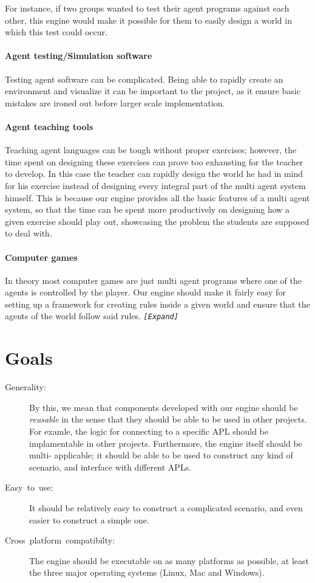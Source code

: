 For instance, if two groups wanted to test their agent programs against
each other, this engine would make it possible for them to easily
design a world in which this test could occur.


\paragraph*{Agent testing/Simulation software}

Testing agent software can be complicated. Being able to rapidly create
an environment and visualize it can be important to the project, as
it ensure basic mistakes are ironed out before larger scale implementation. 


\paragraph*{Agent teaching tools}

Teaching agent languages can be tough without proper exercises; however,
the time spent on designing these exercises can prove too exhausting
for the teacher to develop. In this case the teacher can rapidly design
the world he had in mind for his exercise instead of designing every
integral part of the multi agent system himself. This is because our
engine provides all the basic features of a multi agent system, so
that the time can be spent more productively on designing how a given
exercise should play out, showcasing the problem the students are
supposed to deal with.


\paragraph*{Computer games}

In theory most computer games are just multi agent programs where
one of the agents is controlled by the player. Our engine should make
it fairly easy for setting up a framework for creating rules inside
a given world and ensure that the agents of the world follow said
rules. \texttt{\emph{{[}Expand{]}}}


\section*{Goals}
\begin{description}
\item [{Generality:}] By this, we mean that components developed with our
engine should be \emph{reusable} in the sense that they should be
able to be used in other projects. For examle, the logic for connecting
to a specific APL should be implamentable in other projects. Furthermore,
the engine itself should be multi- applicable; it should be able to
be used to construct any kind of scenario, and interface with different
APLs.
\item [{Easy~to~use:}] It should be relatively easy to construct a complicated
scenario, and even easier to construct a simple one.
\item [{Cross~platform~compatibilty:}] The engine should be executable
on as many platforms as possible, at least the three major operating
systems (Linux, Mac and Windows).
\end{description}

